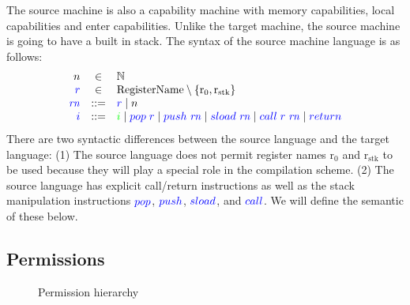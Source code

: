 \documentclass[a4paper]{article}
\newcommand{\sourcecolor}[1]{\color{blue}}
\newcommand{\src}[1]{{\sourcecolor{} #1}}
\newcommand{\targetcolor}[1]{\color{green}}
\newcommand{\trg}[1]{{\targetcolor{} #1}}
\newcommand{\zinstr}[1]{#1}
\newcommand{\oneinstr}[2]{
  \ifthenelse{\equal{#2}{}}
  {\zinstr{#1}}
  {\zinstr{#1} \; #2}
}
\newcommand{\twoinstr}[3]{
  \ifthenelse{\equal{#2#3}{}}
  {\zinstr{#1}}
  {\zinstr{#1} \; #2 \; #3}
}
\newcommand{\sreturn}{\zinstr{\src{return}}}
\newcommand{\spush}[1]{\oneinstr{\src{push}}{#1}}
\newcommand{\spop}[1]{\oneinstr{\src{pop}}{#1}}
\newcommand{\ssload}[1]{\oneinstr{\src{sload}}{#1}}
\newcommand{\scall}[2]{\twoinstr{\src{call}}{#1}{#2}}
\newcommand{\plaindom}[1]{\mathrm{#1}}
\newcommand{\RegName}{\plaindom{RegisterName}}
\newcommand{\nats}{\mathbb{N}}
\newcommand{\var}[1]{\mathit{#1}}
\newcommand{\rn}{\var{rn}}
\newcommand{\rstk}{\mathrm{r}_\mathrm{stk}}
\newcommand{\rO}{\mathrm{r}_0}
\newcommand{\plainperm}[1]{\mathrm{#1}}
\newcommand{\rwlxo}{\plainperm{rwlxo}}
\newcommand{\rwlo}{\plainperm{rwlo}}
\newcommand{\rwl}{\plainperm{rwl}}
\newcommand{\rwxo}{\plainperm{rwxo}}
\newcommand{\rwo}{\plainperm{rwo}}
\newcommand{\rw}{\plainperm{rw}}
\newcommand{\rxo}{\plainperm{rxo}}
\newcommand{\ro}{\plainperm{ro}}
\newcommand{\readonly}{\plainperm{r}}
\newcommand{\noperm}{\plainperm{0}}
\newcommand{\nopermo}{\plainperm{0o}}
\newcommand{\enter}{\plainperm{e}}
\begin{document}
The source machine is also a capability machine with memory capabilities, local capabilities and enter capabilities. Unlike the target machine, the source machine is going to have a built in stack. The syntax of the source machine language is as follows:
\[
  \begin{array}{rcl}
    n & \in & \nats \\
    \src{r} &\in &  \RegName \setminus \{\rO,\rstk\}\\
    \src{\rn} &::= & \src{r} \mid n \\
    \src{i} & ::= &  \trg{i} \mid \spop{\src{r}} \mid \spush{\src{\rn}} \mid \ssload{\src{\rn}} \mid \scall{\src{r}}{\src{\rn}} \mid \sreturn
  \end{array}
\]
There are two syntactic differences between the source language and the target language: (1) The source language does not permit register names $\rO$ and $\rstk$ to be used because they will play a special role in the compilation scheme. (2) The source language has explicit call/return instructions as well as the stack manipulation instructions $\spop{}$, $\spush{}$, $\ssload{}$, and $\scall{}{}$. We will define the semantic of these below.

\subsection{Permissions}


\begin{figure}[!h]
  \centering

  \caption{Permission hierarchy}
  \label{fig:perm-hier}
\end{figure}
\end{document}
